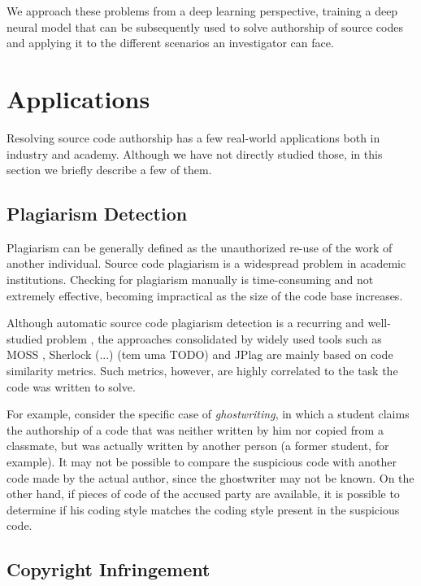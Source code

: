 We approach these problems from a deep learning perspective, training a deep neural model that can be subsequently used to solve authorship of source codes and applying it to the different scenarios an investigator can face.

\section{Applications}

Resolving source code authorship has a few real-world applications both in industry and academy. Although we have not directly studied those, in this section we briefly describe a few of them.

\subsection{Plagiarism Detection}

Plagiarism can be generally defined as the unauthorized re-use of the work of another individual. Source code plagiarism is a widespread problem in academic institutions. Checking for plagiarism manually is time-consuming and not extremely effective, becoming impractical as the size of the code base increases.

Although automatic source code plagiarism detection is a recurring and well-studied problem \cite{plag_survey}, the approaches consolidated by widely used tools such as MOSS \cite{moss}, Sherlock (...) (tem uma TODO) and JPlag \cite{jplag} are mainly based on code similarity metrics. Such metrics, however, are highly correlated to the task the code was written to solve.%

For example, consider the specific case of \textit{ghostwriting}, in which a student claims the authorship of a code that was neither written by him nor copied from a classmate, but was actually written by another person (a former student, for example).  It may not be possible to compare the suspicious code with another code made by the actual author, since the ghostwriter may not be known. On the other hand, if pieces of code of the accused party are available, it is possible to determine if his coding style matches the coding style present in the suspicious code.

\subsection{Copyright Infringement}

